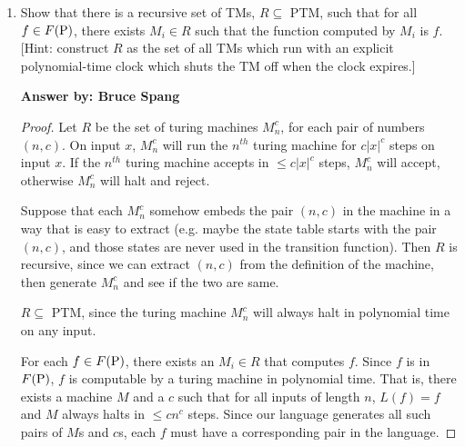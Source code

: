 \documentclass[12pt]{article}
\begin{document}
\begin{enumerate}
\item Show that there is a recursive set of TMs, $R \subseteq$ PTM, such that for all $f \in F(\mbox{{\rm P}})$,
  there exists $M_i \in R$ such that the function computed by $M_i$ is $f$.  [Hint:  construct $R$
    as the set of all TMs which run with an explicit polynomial-time clock which shuts the TM off
    when the clock expires.]

{\bf Answer by: Bruce Spang} 

\begin{proof}
  Let $R$ be the set of turing machines $M_n^c$, for each pair of numbers $(n, c)$. On input $x$, $M_n^c$ will run the $n^{th}$ turing machine for $c|x|^c$ steps on input $x$. If the $n^{th}$ turing machine accepts in $\leq c|x|^c$ steps, $M_n^c$ will accept, otherwise $M_n^c$ will halt and reject.

  Suppose that each $M_n^c$ somehow embeds the pair $(n,c)$ in the machine in a way that is easy to extract (e.g. maybe the state table starts with the pair $(n,c)$, and those states are never used in the transition function). Then $R$ is recursive, since we can extract $(n, c)$ from the definition of the machine, then generate $M_n^c$ and see if the two are same.

  $R \subseteq$ PTM, since the turing machine $M_n^c$ will always halt in polynomial time on any input.

  For each $f \in F(\mbox{{\rm P}})$, there exists an $M_i \in R$ that computes $f$. Since $f$ is in $F(\mbox{{\rm P}})$, $f$ is computable by a turing machine in polynomial time. That is, there exists a machine $M$ and a $c$ such that for all inputs of length $n$, $L(f) = f$ and $M$ always halts in $\leq cn^c$ steps. Since our language generates all such pairs of $M$s and $c$s, each $f$ must have a corresponding pair in the language.
\end{proof}



\end{enumerate}
\end{document}
